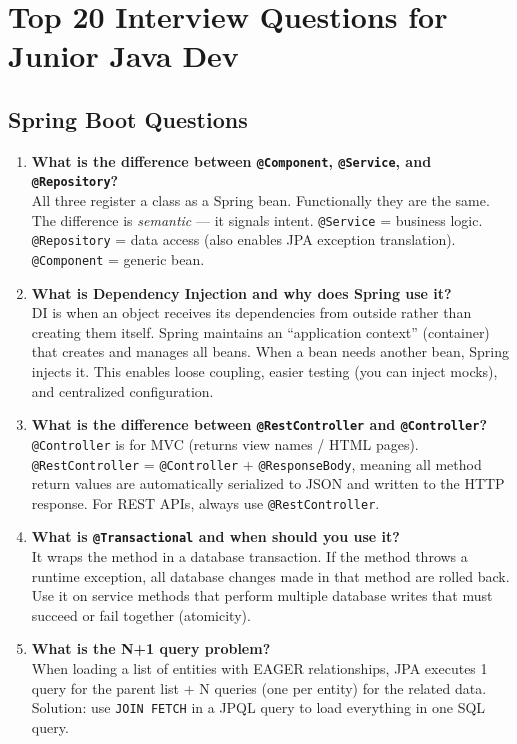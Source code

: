 \documentclass[12pt,a4paper]{report}
\newcommand{\code}[1]{\texttt{\textcolor{keywordblue}{#1}}}
\begin{document}
\section{Top 20 Interview Questions for Junior Java Dev}

\subsection{Spring Boot Questions}

\begin{enumerate}
  \item \textbf{What is the difference between \code{@Component}, \code{@Service}, and \code{@Repository}?}\\
  All three register a class as a Spring bean. Functionally they are the same. The difference is \textit{semantic} --- it signals intent. \code{@Service} = business logic. \code{@Repository} = data access (also enables JPA exception translation). \code{@Component} = generic bean.

  \item \textbf{What is Dependency Injection and why does Spring use it?}\\
  DI is when an object receives its dependencies from outside rather than creating them itself. Spring maintains an ``application context'' (container) that creates and manages all beans. When a bean needs another bean, Spring injects it. This enables loose coupling, easier testing (you can inject mocks), and centralized configuration.

  \item \textbf{What is the difference between \code{@RestController} and \code{@Controller}?}\\
  \code{@Controller} is for MVC (returns view names / HTML pages). \code{@RestController} = \code{@Controller} + \code{@ResponseBody}, meaning all method return values are automatically serialized to JSON and written to the HTTP response. For REST APIs, always use \code{@RestController}.

  \item \textbf{What is \code{@Transactional} and when should you use it?}\\
  It wraps the method in a database transaction. If the method throws a runtime exception, all database changes made in that method are rolled back. Use it on service methods that perform multiple database writes that must succeed or fail together (atomicity).

  \item \textbf{What is the N+1 query problem?}\\
  When loading a list of entities with EAGER relationships, JPA executes 1 query for the parent list + N queries (one per entity) for the related data. Solution: use \code{JOIN FETCH} in a JPQL query to load everything in one SQL query.
\end{enumerate}
\end{document}
